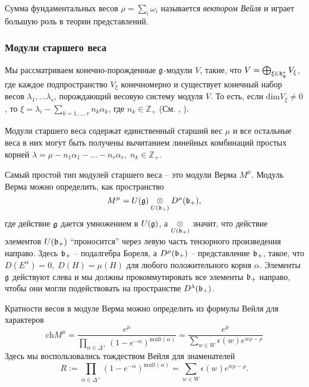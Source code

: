 Сумма фундаментальных весов $\rho=\sum_{i} \omega_{i}$ называется {\it вектором Вейля} и играет большую роль в теории представлений.

\subsubsection{Модули старшего веса}
\label{sec:high-weight-modul}

Мы рассматриваем конечно-порожденные  $\mathfrak{g}$-модули $V$, такие, что $V=\bigoplus_{\xi\in \mathfrak{h}_{\mathfrak{g}}^{*}} V_{\xi}$, где каждое подпространство $V_{\xi}$ конечномерно и существует конечный набор весов $\lambda_{1},\dots \lambda_{s}$, порождающий весовую систему модуля $V$. То есть, если $\mathrm{dim}V_{\xi}\neq 0$, то $\xi=\lambda_{i}-\sum_{k=1,\dots, r} n_{k}\alpha_{k}$, где $n_{k}\in \mathbb{Z}_{+}$ (См.  \cite{humphreys2008representations}, \cite{carter2005lie}).

Модули старшего веса содержат единственный старший вес $\mu$ и все остальные веса в них могут быть получены вычитанием линейных комбинаций простых корней $\lambda=\mu-n_{1}\alpha_{1}-\dots-n_{r}\alpha_{r},\; n_{k}\in \mathbb{Z} _{+}$.

Самый простой тип модулей старшего веса -- это модули Верма $M^{\mu}$. Модуль Верма можно определить, как пространство
\begin{equation}
  \label{eq:17}
  M^{\mu}=U(\mathfrak{g})\underset{U(\mathfrak{b}_{+})}{\otimes} D^{\mu}(\mathfrak{b}_{+}),
\end{equation}
где действие $\mathfrak{g}$ дается умножением в $U(\mathfrak{g})$, а
$\underset{U(\mathfrak{b}_{+})}{\otimes}$ значит, что действие элементов $U(\mathfrak{b}_{+})$ ``проносится'' через левую часть тензорного произведения направо. Здесь $\mathfrak{b}_{+}$ -- подалгебра Бореля, а $D^{\mu}(\mathfrak{b}_{+})$ -- представление $\mathfrak{b}_{+}$, такое, что $D(E^{\alpha})=0,\; D(H)=\mu(H)$ для любого положительного корня $\alpha$.
Элементы  $\mathfrak{g}$ действуют слева и мы должны прокоммутировать все элементы $\mathfrak{b}_{+}$ направо, чтобы они могли подействовать на пространстве $D^{\lambda}(\mathfrak{b}_{+})$.

Кратности весов в модуле Верма можно определить из формулы Вейля для характеров
\begin{equation}
  \label{eq:122}
  \mathrm{ch} M^{\mu}=\frac{e^{\mu}}{\prod_{\alpha\in \Delta^{+}} \left( 1-e^{-\alpha}\right)^{\mathrm{mult}(\alpha)}}=\frac{e^{\mu}}{\sum_{w\in W} \epsilon(w) e^{w\rho-\rho}}
\end{equation}
Здесь мы воспользовались тождеством Вейля для знаменателей
\begin{equation}
  \label{eq:123}
  R:=\prod_{\alpha\in \Delta^{+}} \left( 1-e^{-\alpha}\right)^{\mathrm{mult}(\alpha)}=\sum_{w\in W} \epsilon(w) e^{w\rho-\rho}.
\end{equation}

